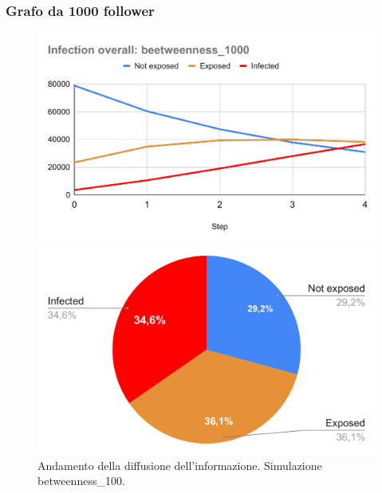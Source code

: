         \subsubsection{Grafo da 1000 follower}

            \begin{figure}[H]
                \centering
                \begin{minipage}[c]{0.55\textwidth}
                    \includegraphics[width=\textwidth]{resources/charts/Infection overall_ beetweenness_1000.pdf}
                \end{minipage}
                \hfill
                \begin{minipage}[c]{0.44\textwidth}
                    \includegraphics[width=\textwidth]{resources/charts/pie_btw_1000.pdf}
                \end{minipage}
                \caption{Andamento della diffusione dell'informazione. Simulazione betweenness\_100.}
            \end{figure}
            
